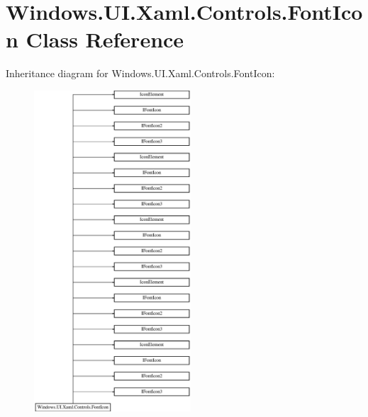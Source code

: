 \hypertarget{class_windows_1_1_u_i_1_1_xaml_1_1_controls_1_1_font_icon}{}\section{Windows.\+U\+I.\+Xaml.\+Controls.\+Font\+Icon Class Reference}
\label{class_windows_1_1_u_i_1_1_xaml_1_1_controls_1_1_font_icon}
Inheritance diagram for Windows.\+U\+I.\+Xaml.\+Controls.\+Font\+Icon\+:\begin{figure}[H]
\begin{center}
\leavevmode
\includegraphics[height=12.000000cm]{class_windows_1_1_u_i_1_1_xaml_1_1_controls_1_1_font_icon}
\end{center}
\end{figure}
